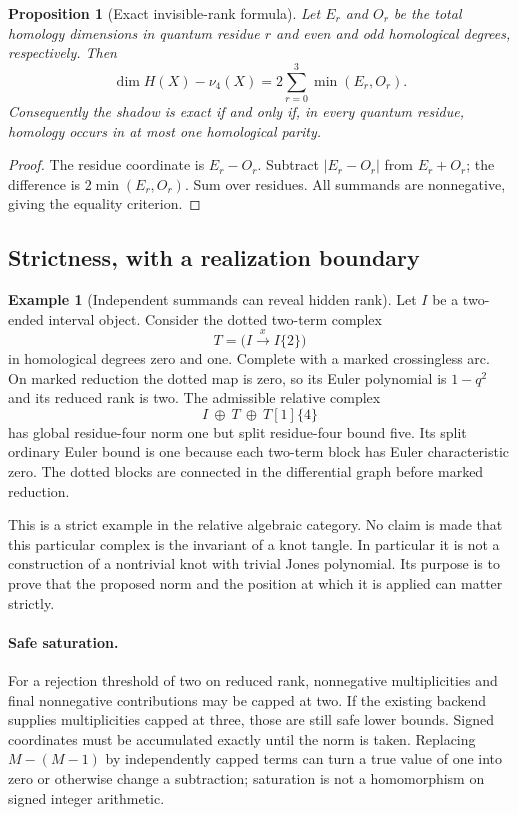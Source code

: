 \documentclass[11pt]{article}
\newtheorem{proposition}[theorem]{Proposition}
\theoremstyle{definition}
\newtheorem{example}[theorem]{Example}
\theoremstyle{remark}
\newcommand{\nuFour}{\nu_4}
\begin{document}
\begin{proposition}[Exact invisible-rank formula]\label{prop:defect}
Let $E_r$ and $O_r$ be the total homology dimensions in quantum residue $r$
and even and odd homological degrees, respectively. Then
\begin{equation}\label{eq:defect}
 \dim H(X)-\nuFour(X)=2\sum_{r=0}^3\min(E_r,O_r).
\end{equation}
Consequently the shadow is exact if and only if, in every quantum residue,
homology occurs in at most one homological parity.
\end{proposition}
\begin{proof}
The residue coordinate is $E_r-O_r$. Subtract $|E_r-O_r|$ from $E_r+O_r$;
the difference is $2\min(E_r,O_r)$. Sum over residues. All summands are
nonnegative, giving the equality criterion.
\end{proof}

\subsection{Strictness, with a realization boundary}
\begin{example}[Independent summands can reveal hidden rank]\label{ex:strict}
Let $I$ be a two-ended interval object. Consider the dotted two-term complex
\[
 T=\bigl(I\xrightarrow{x}I\{2\}\bigr)
\]
in homological degrees zero and one. Complete with a marked crossingless
arc. On marked reduction the dotted map is zero, so its Euler polynomial is
$1-q^2$ and its reduced rank is two. The admissible relative complex
\[
 I\ \oplus\ T\ \oplus\ T[1]\{4\}
\]
has global residue-four norm one but split residue-four bound five. Its
split ordinary Euler bound is one because each two-term block has Euler
characteristic zero. The dotted blocks are connected in the differential
graph before marked reduction.

This is a strict example in the relative algebraic category. No claim is
made that this particular complex is the invariant of a knot tangle. In
particular it is not a construction of a nontrivial knot with trivial Jones
polynomial. Its purpose is to prove that the proposed norm and the position
at which it is applied can matter strictly.
\end{example}

\paragraph{Safe saturation.}
For a rejection threshold of two on reduced rank, nonnegative multiplicities
and final nonnegative contributions may be capped at two. If the existing
backend supplies multiplicities capped at three, those are still safe lower
bounds. Signed coordinates must be accumulated exactly until the norm is
taken. Replacing $M-(M-1)$ by independently capped terms can turn a true
value of one into zero or otherwise change a subtraction; saturation is not
a homomorphism on signed integer arithmetic.
\end{document}
